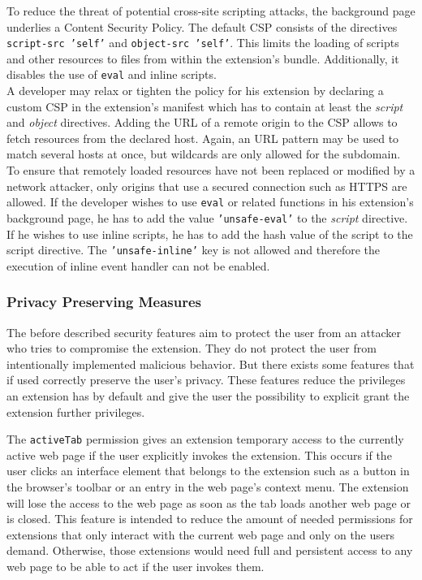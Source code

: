 	To reduce the threat of potential cross-site scripting attacks, the background page underlies a Content Security Policy. The default CSP consists of the directives \texttt{script-src 'self'} and \texttt{object-src 'self'}. This limits the loading of scripts and other resources to files from within the extension's bundle. Additionally, it disables the use of \texttt{eval} and inline scripts.  \\
	A developer may relax or tighten the policy for his extension by declaring a custom CSP in the extension's manifest which has to contain at least the \textit{script} and \textit{object} directives. Adding the URL of a remote origin to the CSP allows to fetch resources from the declared host. Again, an URL pattern may be used to match several hosts at once, but wildcards are only allowed for the subdomain. To ensure that remotely loaded resources have not been replaced or modified by a network attacker, only origins that use a secured connection such as HTTPS are allowed. If the developer wishes to use \texttt{eval} or related functions in his extension's background page, he has to add the value \texttt{'unsafe-eval'} to the \textit{script} directive. If he wishes to use inline scripts, he has to add the hash value of the script to the script directive. The \texttt{'unsafe-inline'} key is not allowed and therefore the execution of inline event handler can not be enabled.

\subsubsection{Privacy Preserving Measures}

	The before described security features aim to protect the user from an attacker who tries to compromise the extension. They do not protect the user from intentionally implemented malicious behavior. But there exists some features that if used correctly preserve the user's privacy. These features reduce the privileges an extension has by default and give the user the possibility to explicit grant the extension further privileges. 
	
	The \texttt{activeTab} permission gives an extension temporary access to the currently active web page if the user explicitly invokes the extension. This occurs if the user clicks an interface element that belongs to the extension such as a button in the browser's toolbar or an entry in the web page's context menu. The extension will lose the access to the web page as soon as the tab loads another web page or is closed. This feature is intended to reduce the amount of needed permissions for extensions that only interact with the current web page and only on the users demand. Otherwise, those extensions would need full and persistent access to any web page to be able to act if the user invokes them.
	
